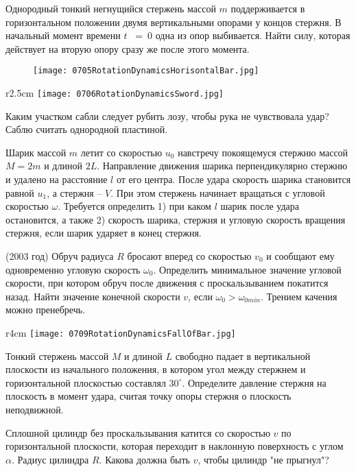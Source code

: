 \AddProb Однородный тонкий негнущийся стержень массой $m$ поддерживается в горизонтальном положении двумя вертикальными опорами у концов стержня. 
В начальный момент времени $t$~ =~0 одна из опор выбивается. Найти силу, которая действует на вторую опору сразу же после этого момента.

\begin{figure}[h]
\centering
\texttt{[image: 0705RotationDynamicsHorisontalBar.jpg]}
\end{figure}

\begin{wrapfigure}{r}{2.5cm}
\texttt{[image: 0706RotationDynamicsSword.jpg]}
\end{wrapfigure}

\AddProb Каким участком сабли следует рубить лозу, чтобы рука не чувствовала удар? Саблю считать однородной пластиной.

\AddProb Шарик массой $m$ летит со скоростью $u_0$ навстречу покоящемуся стержню массой $M = 2m$ и длиной $2L$. 
Направление движения шарика перпендикулярно стержню и удалено на расстояние $l$ от его центра. 
После удара скорость шарика становится равной $u_1$, а стержня -- $V$. При этом стержень начинает вращаться с угловой скоростью $\omega$. 
Требуется определить 1) при каком $l$ шарик после удара остановится, а также 
2) скорость шарика, стержня и угловую скорость вращения стержня, если шарик ударяет в конец стержня.

\AddProb (2003 год) Обруч радиуса $R$ бросают вперед со скоростью $v_0$ и сообщают ему одновременно угловую скорость $\omega_0$. 
Определить минимальное значение угловой скорости, при котором обруч после движения с проскальзыванием покатится назад. 
Найти значение конечной скорости $v$, если $\omega_0 > \omega_{0min} $. Трением качения можно пренебречь.

\begin{wrapfigure}{r}{4cm}
\texttt{[image: 0709RotationDynamicsFallOfBar.jpg]}
\end{wrapfigure}

\AddProb Тонкий стержень массой $M$ и длиной $L$ свободно падает в вертикальной плоскости из начального положения, 
в котором угол между стержнем и горизонтальной плоскостью составлял $30^{\circ}$. 
Определите давление стержня на плоскость в момент удара, считая точку опоры стержня о плоскость неподвижной.

\AddProb Сплошной цилиндр без проскальзывания катится со скоростью $v$ по горизонтальной плоскости, 
которая переходит в наклонную поверхность с углом $\alpha$. Радиус цилиндра $R$. Какова должна быть $v$, чтобы цилиндр "не прыгнул"?


